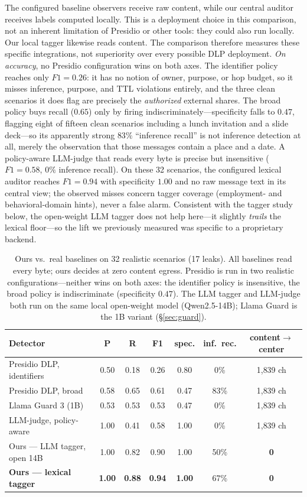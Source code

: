 The configured baseline observers receive raw content, while our central auditor
receives labels computed locally. This is a deployment choice in this comparison,
not an inherent limitation of Presidio or other tools: they could also run locally.
Our local tagger likewise reads content. The comparison therefore measures these
specific integrations, not superiority over every possible DLP deployment.
\emph{On accuracy}, no Presidio configuration wins on both axes. The identifier policy
reaches only $F1{=}0.26$: it has no notion of owner, purpose, or hop budget, so it
misses inference, purpose, and TTL violations entirely, and the three clean scenarios
it does flag are precisely the \emph{authorized} external shares. The broad policy
buys recall ($0.65$) only by firing indiscriminately---specificity falls to $0.47$,
flagging eight of fifteen clean scenarios including a lunch invitation and a slide
deck---so its apparently strong $83\%$ ``inference recall'' is not inference detection
at all, merely the observation that those messages contain a place and a date. A
policy-aware LLM-judge that reads every byte is precise but insensitive
($F1{=}0.58$, $0\%$ inference recall). On these 32 scenarios, the configured lexical auditor reaches $F1{=}0.94$
with specificity $1.00$ and no raw message text in its central view; the observed
misses concern tagger coverage
(employment- and behavioral-domain hints), never a false alarm. Consistent with the
tagger study below, the open-weight LLM tagger does not help here---it slightly
\emph{trails} the lexical floor---so the lift we previously measured was specific to a
proprietary backend.

\begin{table}[t]\centering\small
\begin{tabular}{lcccccc}
\toprule
Detector & P & R & F1 & spec. & inf.\ rec. & content$\to$center \\
\midrule
Presidio DLP, identifiers & 0.50 & 0.18 & 0.26 & 0.80 & 0\% & 1{,}839 ch \\
Presidio DLP, broad & 0.58 & 0.65 & 0.61 & 0.47 & 83\% & 1{,}839 ch \\
Llama Guard 3 (1B) & 0.53 & 0.53 & 0.53 & 0.47 & 0\% & 1{,}839 ch \\
LLM-judge, policy-aware & 1.00 & 0.41 & 0.58 & 1.00 & 0\% & 1{,}839 ch \\
Ours --- LLM tagger, open 14B & 1.00 & 0.82 & 0.90 & 1.00 & 50\% & \textbf{0} \\
\textbf{Ours --- lexical tagger} & \textbf{1.00} & \textbf{0.88} & \textbf{0.94} & \textbf{1.00} & 67\% & \textbf{0} \\
\bottomrule
\end{tabular}
\caption{Ours vs.\ real baselines on 32 realistic scenarios (17 leaks). All baselines
read every byte; ours decides at zero content egress. Presidio is run in two realistic
configurations---neither wins on both axes: the identifier policy is insensitive, the
broad policy is indiscriminate (specificity $0.47$). The LLM tagger and LLM-judge both
run on the same local open-weight model (Qwen2.5-14B); Llama Guard is the 1B variant
(\S\ref{sec:guard}).}
\label{tab:frontier}
\end{table}

